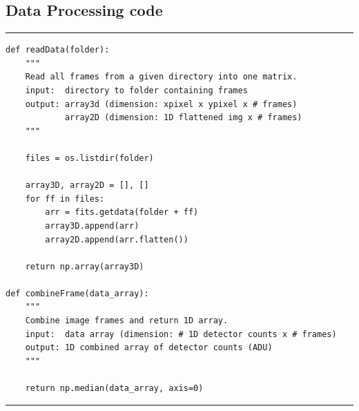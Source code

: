 \documentclass[preprint]{aastex62}
\begin{document}
\subsection{Data Processing code} \label{code:data} 
\hrule
\begin{lstlisting}
def readData(folder):
    """
    Read all frames from a given directory into one matrix.
    input:  directory to folder containing frames
    output: array3d (dimension: xpixel x ypixel x # frames)
            array2D (dimension: 1D flattened img x # frames)
    """
    
    files = os.listdir(folder)

    array3D, array2D = [], []
    for ff in files:
        arr = fits.getdata(folder + ff)
        array3D.append(arr)
        array2D.append(arr.flatten())
    
    return np.array(array3D)

def combineFrame(data_array):
    """
    Combine image frames and return 1D array.
    input:  data array (dimension: # 1D detector counts x # frames)
    output: 1D combined array of detector counts (ADU)
    """
    
    return np.median(data_array, axis=0)
\end{lstlisting}
\hrule \vspace{7pt}
\end{document}
